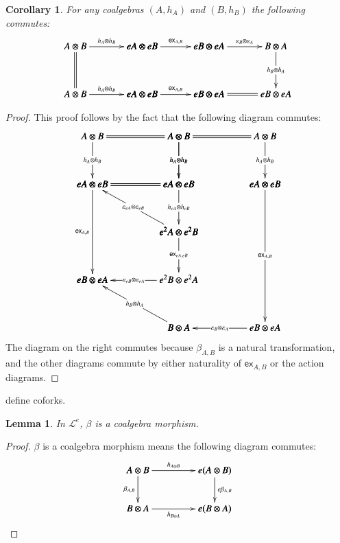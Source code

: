 \documentclass{article}
\newtheorem{lemma}[theorem]{Lemma}
\newtheorem{corollary}[theorem]{Corollary}
\newcommand{\cat}[1]{\mathcal{#1}}
\newcommand{\e}[1]{\mathsf{ex}_{#1}}
\begin{document}
\begin{corollary}
  \label{corollary:ex-simple}
  For any coalgebras $(A,h_A)$ and $(B,h_B)$ the following commutes:
    \[
    \bfig
    \square|aaaa|/->`=``->/<700,500>[
      A \otimes B`
      eA \otimes eB`
      A \otimes B`
      eA \otimes eB;
      h_A \otimes h_B```
      h_A \otimes h_B]

    \square(700,0)|aaaa|/->```->/<700,500>[
      eA \otimes eB`
      eB \otimes eA`
      eA \otimes eB`
      eB \otimes eA;
      \e{A,B}```
      \e{A,B}]

    \square(1400,0)|aama|/->``->`=/<700,500>[
      eB \otimes eA`
      B \otimes A`
      eB \otimes eA`
      eB \otimes eA;
      \varepsilon_B \otimes \varepsilon_A``
      h_B \otimes h_A`]
      \efig
    \]
\end{corollary}
\begin{proof}
  This proof follows by the fact that the following diagram commutes:
  \[
  \bfig
  \square|mmmm|/=`->`->`=/<900,500>[
    A \otimes B`
    A \otimes B`
    eA \otimes eB`
    eA \otimes eB;`
    h_A \otimes h_B`
    h_A \otimes h_B`]

  \qtriangle(0,-500)|mmm|/=`<-`->/<900,500>[
    eA \otimes eB`
    eA \otimes eB`
    e^2A \otimes e^2B;`
    \varepsilon_{eA} \otimes \varepsilon_{eB}`
    h_{eA} \otimes h_{eB}]

  \dtriangle(0,-1000)|mmm|/`->`<-/<900,500>[
    e^2A \otimes e^2B`
    eB \otimes eA`
    e^2B \otimes e^2A;`
    \e{eA,eB}`
    \varepsilon_{eB} \otimes \varepsilon_{eA}]

  \morphism(0,0)<0,-1000>[eA \otimes eB`eB \otimes eA;\e{A,B}]

  \square(900,0)|mmmm|/=`->`->`/<900,500>[
    A \otimes B`
    A \otimes B`
    eA \otimes eB`
    eA \otimes eB;`
    h_A \otimes h_B`
    h_A \otimes h_B`]

  \dtriangle(900,-1500)|mmm|/`->`<-/<900,1500>[
    eA \otimes eB`
    B \otimes A`
    eB \otimes eA;`
    \e{A,B}`
    \varepsilon_{B} \otimes \varepsilon_A]

  \morphism(900,-1500)|m|<-900,500>[B \otimes A`eB \otimes eA;h_B \otimes h_A]
  \efig
  \]
  The diagram on the right commutes because $\beta_{A,B}$ is a natural
  transformation, and the other diagrams commute by either naturality
  of $\e{A,B}$ or the action diagrams.
\end{proof}

define coforks.

\begin{lemma}
  \label{lemma:beta-coalgebra-morph}
  In $\cat{L}^e$, $\beta$ is a coalgebra morphism.
\end{lemma}
\begin{proof}
  $\beta$ is a coalgebra morphism means the following diagram commutes:
  \[
  \bfig
    \square<800,400>[
      A\otimes B`
      e(A\otimes B)`
      B\otimes A`
      e(B\otimes A);
      h_{A\otimes B}`
      \beta_{A,B}`
      e\beta_{A,B}`
      h_{B\otimes A}]
  \efig
  \]
\end{proof}
\end{document}
